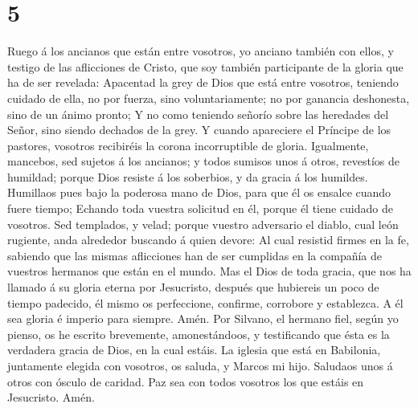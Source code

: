 \hypertarget{section-4}{%
\section{5}\label{section-4}}

 Ruego á los ancianos que están entre vosotros, yo anciano
también con ellos, y testigo de las aflicciones de Cristo, que soy
también participante de la gloria que ha de ser revelada: 
Apacentad la grey de Dios que está entre vosotros, teniendo cuidado de
ella, no por fuerza, sino voluntariamente; no por ganancia deshonesta,
sino de un ánimo pronto;  Y no como teniendo señorío sobre
las heredades del Señor, sino siendo dechados de la grey. 
Y cuando apareciere el Príncipe de los pastores, vosotros recibiréis la
corona incorruptible de gloria.  Igualmente, mancebos, sed
sujetos á los ancianos; y todos sumisos unos á otros, revestíos de
humildad; porque Dios resiste á los soberbios, y da gracia á los
humildes.  Humillaos pues bajo la poderosa mano de Dios,
para que él os ensalce cuando fuere tiempo;  Echando toda
vuestra solicitud en él, porque él tiene cuidado de vosotros.
 Sed templados, y velad; porque vuestro adversario el
diablo, cual león rugiente, anda alrededor buscando á quien devore:
 Al cual resistid firmes en la fe, sabiendo que las mismas
aflicciones han de ser cumplidas en la compañía de vuestros hermanos que
están en el mundo.  Mas el Dios de toda gracia, que nos
ha llamado á su gloria eterna por Jesucristo, después que hubiereis un
poco de tiempo padecido, él mismo os perfeccione, confirme, corrobore y
establezca.  A él sea gloria é imperio para siempre.
Amén.  Por Silvano, el hermano fiel, según yo pienso, os
he escrito brevemente, amonestándoos, y testificando que ésta es la
verdadera gracia de Dios, en la cual estáis.  La iglesia
que está en Babilonia, juntamente elegida con vosotros, os saluda, y
Marcos mi hijo.  Saludaos unos á otros con ósculo de
caridad. Paz sea con todos vosotros los que estáis en Jesucristo. Amén.
